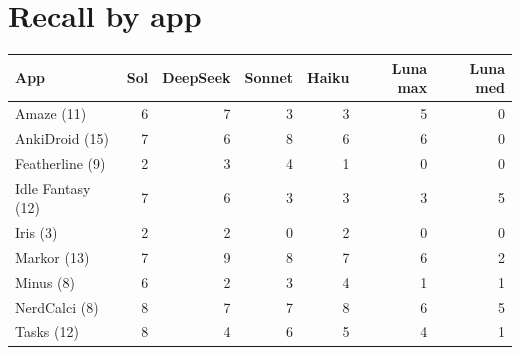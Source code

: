 \documentclass[11pt]{article}
\begin{document}
\section{Recall by app}
\begin{table}[h]
\centering\small
\begin{tabular}{lrrrrrr}
\toprule
App & Sol & DeepSeek & Sonnet & Haiku & Luna max & Luna med \\
\midrule
Amaze (11) & 6 & 7 & 3 & 3 & 5 & 0 \\
AnkiDroid (15) & 7 & 6 & 8 & 6 & 6 & 0 \\
Featherline (9) & 2 & 3 & 4 & 1 & 0 & 0 \\
Idle Fantasy (12) & 7 & 6 & 3 & 3 & 3 & 5 \\
Iris (3) & 2 & 2 & 0 & 2 & 0 & 0 \\
Markor (13) & 7 & 9 & 8 & 7 & 6 & 2 \\
Minus (8) & 6 & 2 & 3 & 4 & 1 & 1 \\
NerdCalci (8) & 8 & 7 & 7 & 8 & 6 & 5 \\
Tasks (12) & 8 & 4 & 6 & 5 & 4 & 1 \\
\bottomrule
\end{tabular}
\end{table}
\end{document}
